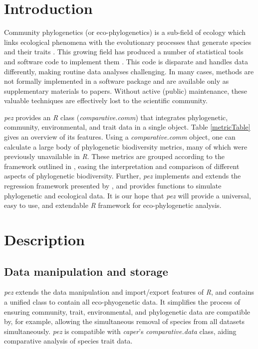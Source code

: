 \documentclass{bioinfo}
\begin{document}
\section{Introduction}
Community phylogenetics (or eco-phylogenetics) is a sub-field of
ecology which links ecological phenomena with the evolutionary
processes that generate species and their traits
\citep[see][]{Webb2002}. This growing field has produced a number of
statistical tools and software code to implement them
\citep[\emph{e.g.},][]{Kembel2010}. This code is disparate and handles
data differently, making routine data analyses challenging. In many
cases, methods are not formally implemented in a software package and
are available only as supplementary materials to papers. Without
active (public) maintenance, these valuable techniques are effectively
lost to the scientific community.

\emph{pez} provides an \emph{R} \citep{R2014} class
(\emph{comparative.comm}) that integrates phylogenetic, community,
environmental, and trait data in a single object. Table
\ref{metricTable} gives an overview of its features. Using a
\emph{comparative.comm} object, one can calculate a large body of
phylogenetic biodiversity metrics, many of which were previously
unavailable in \emph{R}. These metrics are grouped according to the
framework outlined in \citet{Pearse2014review}, easing the
interpretation and comparison of different aspects of phylogenetic
biodiversity. Further, \emph{pez} implements and extends the
regression framework presented by \citep{Cavender-Bares2004}, and
provides functions to simulate phylogenetic and ecological data. It is
our hope that \emph{pez} will provide a universal, easy to use, and
extendable \emph{R} framework for eco-phylogenetic analysis.
\section{Description}
\subsection{Data manipulation and storage}
\emph{pez} extends the data manipulation and import/export features of
\emph{R}, and contains a unified class to contain all eco-phyogenetic
data. It simplifies the process of ensuring community, trait,
environmental, and phylogenetic data are compatible by, for example,
allowing the simultaneous removal of species from all datasets
simultaneously. \emph{pez} is compatible with \emph{caper}'s
\citep{Orme2013} \emph{comparative.data} class, aiding comparative
analysis of species trait data.
\end{document}
